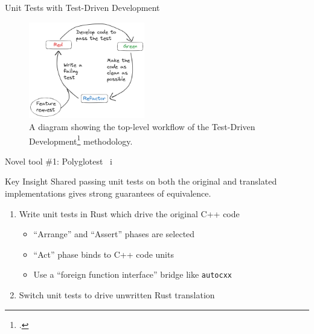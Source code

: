\documentclass[10pt,aspectratio=169]{beamer}
\begin{document}
\begin{frame}{Unit Tests with Test-Driven Development}
    \begin{figure}[H]
        \hspace*{-1cm}
        \includegraphics[width=0.45\textwidth]{images/excalidraw_tdd.png}
        \caption{A diagram showing the top-level workflow of the Test-Driven Development\footcite{beckTestDrivenDevelopment2022} methodology.}
        \label{fig:tdd_workflow}
    \end{figure}
    \vspace*{1cm}
\end{frame}

\begin{frame}{Novel tool \#1: Polyglotest \ i}
    \begin{alertblock}{Key Insight}
        \vspace*{0.25cm}
        Shared passing unit tests on both the original and translated implementations gives strong guarantees of equivalence.
    \end{alertblock}
    \vspace*{0.5cm}
    \begin{enumerate}
        \item<2-> Write unit tests in Rust which drive the original C++ code
        \begin{itemize}
            \item ``Arrange'' and ``Assert'' phases are selected
            \item ``Act'' phase binds to C++ code units
            \item Use a ``foreign function interface'' bridge like \texttt{autocxx}
        \end{itemize}
        \item<3-> Switch unit tests to drive unwritten Rust translation
    \end{enumerate}
    \vspace*{0.5cm}
\end{frame}
\end{document}
